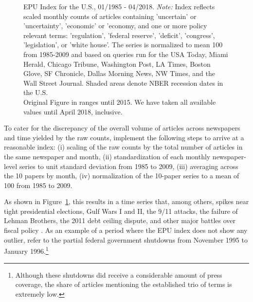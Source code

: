 \documentclass[a4paper,11pt,listof=nochaptergap,oneside,pointednumbers,bibtotoc,bigheadings,liststotoc]{scrbook}
\theoremstyle{mysatz}
\theoremstyle{mydefinition}
\theoremstyle{mybemerkung}
\begin{document}
\begin{figure}[!h]
   \centering
   \setlength\fboxsep{0pt}
   \setlength\fboxrule{0pt}
      \caption[EPU Index for the U.S., 01/1985 - 04/2018.]{EPU Index for the U.S., 01/1985 - 04/2018.
      \textit{Note:} Index reflects scaled monthly counts of articles containing 'uncertain' or 'uncertainty', 'economic' or 'economy, and one or more policy relevant terms: 'regulation', 'federal reserve', 'deficit', 'congress', 'legislation', or 'white house'. The series is normalized to mean 100 from 1985-2009 and based on queries run for the USA Today, Miami Herald, Chicago Tribune, Washington Post, LA Times, Boston Glove, SF Chronicle, Dallas Morning News, NW Times, and the Wall Street Journal. Shaded areas denote NBER recession dates in the U.S.\\
      Original Figure in \citet{bakeretal:15} ranges until 2015. We have taken all available values until April 2018, inclusive.}   \label{fig:epuindex}
\end{figure}

To cater for the discrepancy of the overall volume of articles across newspapers and time yielded by the raw counts, \citet{bakeretal:15} implement the following steps to arrive at a reasonable index: (i) scaling of the raw counts by the total number of articles in the same newspaper and month, (ii) standardization of each monthly newspaper-level series to unit standard deviation from 1985 to 2009, (iii) averaging across the 10 papers by month, (iv) normalization of the 10-paper series to a mean of 100 from 1985 to 2009.

As shown in Figure~\ref{fig:epuindex}, this results in a time series that, among others, spikes near tight presidential elections, Gulf Wars I and II, the 9/11 attacks, the failure of Lehman Brothers, the 2011 debt ceiling dispute, and other major battles over fiscal policy \citep{bakeretal:15}. As an example of a period where the EPU index does not show any outlier, \citet{bakeretal:15} refer to the partial federal government shutdowns from November 1995 to January 1996.\footnote{Although these shutdowns did receive a considerable amount of press coverage, the share of articles mentioning the established trio of terms is extremely low.} 
\end{document}
